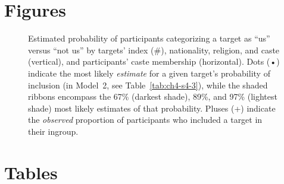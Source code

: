 \documentclass[12pt,a4paper]{article}
\begin{document}

\section*{Figures}

\begin{figure}[h]
\centering
\caption[Estimated probabilities of participants' categorizing a target as ``us'' versus ``not us'']{Estimated probability of participants categorizing a target as ``us'' versus ``not us'' by targets' index (\#), nationality, religion, and caste (vertical), and participants' caste membership (horizontal). Dots (•) indicate the most likely \emph{estimate} for a given target's probability of inclusion (in Model~2, see Table~\ref{tab:ch4-s4-3}), while the shaded ribbons encompass the 67\% (darkest shade), 89\%, and 97\% (lightest shade) most likely estimates of that probability. Pluses (+) indicate the \emph{observed} proportion of participants who included a target in their ingroup.}
\label{fig:f1}
\end{figure}

\section*{Tables}
\end{document}
